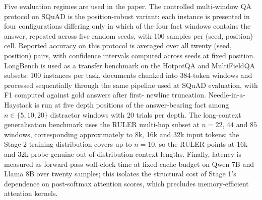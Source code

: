 Five evaluation regimes are used in the paper. The controlled
multi-window QA protocol on SQuAD\cite{rajpurkar2016squad} is the
position-robust variant: each instance is presented in four
configurations differing only in which of the four fact windows
contains the answer, repeated across five random seeds, with 100
samples per (seed, position) cell. Reported accuracy on this protocol
is averaged over all twenty (seed, position) pairs, with confidence
intervals computed across seeds at fixed position. LongBench\cite{bai2024longbench}
is used as a transfer benchmark on the HotpotQA and MultiFieldQA
subsets: 100 instances per task, documents chunked into 384-token
windows and processed sequentially through the same pipeline used at
SQuAD evaluation, with F1 computed against gold answers after first-
newline truncation. Needle-in-a-Haystack is run at five depth
positions of the answer-bearing fact among $n\in\{5,10,20\}$ distractor
windows with 20 trials per depth. The long-context generalisation
benchmark uses the RULER\cite{hsieh2024ruler} multi-hop subset at
$n=22$, $44$ and $85$ windows, corresponding approximately to 8k, 16k
and 32k input tokens; the Stage-2 training distribution covers up to
$n=10$, so the RULER points at 16k and 32k probe genuine
out-of-distribution context lengths. Finally, latency is measured as
forward-pass wall-clock time at fixed cache budget on Qwen 7B and
Llama 8B over twenty samples; this isolates the structural cost of
Stage 1's dependence on post-softmax attention scores, which precludes
memory-efficient attention kernels.
